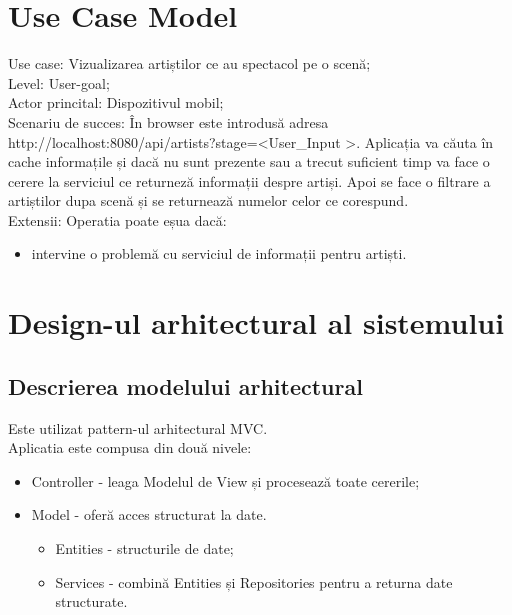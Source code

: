 \documentclass[11pt,a4paper,twoside,notitlepage]{article}
\begin{document}
\section{Use Case Model}

Use case: Vizualizarea artiștilor ce au spectacol pe o scenă; \\
Level: User-goal; \\
Actor princital: Dispozitivul mobil; \\
Scenariu de succes: În browser este introdusă adresa \\ http://localhost:8080/api/artists?stage=\textless User\_Input \textgreater. Aplicația va căuta în cache informațile și dacă nu sunt prezente sau a trecut suficient timp va face o cerere la serviciul ce returneză informații despre artiși. Apoi se face o filtrare a artiștilor dupa scenă și se returnează numelor celor ce corespund. \\
Extensii: Operatia poate eșua dacă:
\begin{itemize}
	\item intervine o problemă cu serviciul de informații pentru artiști.
\end{itemize}
\newpage


\section{Design-ul arhitectural al sistemului}

\subsection{Descrierea modelului arhitectural}
Este utilizat pattern-ul arhitectural MVC.\\
Aplicatia este compusa din două nivele: 
\begin{itemize}
	\item Controller - leaga Modelul de View și procesează toate cererile;
	\item Model - oferă acces structurat la date. 
																	\begin{itemize}
																		\item Entities - structurile de date;
															
		\item Services - combină Entities și Repositories pentru a returna date structurate.
																	\end{itemize}
\end{itemize}
\end{document}

